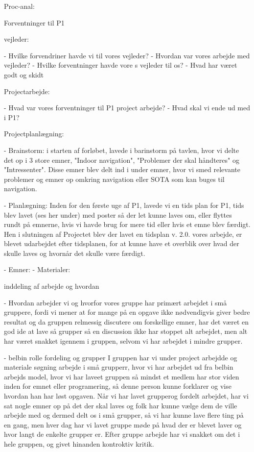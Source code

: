 Proc-anal:

Forventninger til P1

vejleder:

- Hvilke forvendriner havde vi til vores vejleder?
- Hvordan var vores arbejde med vejleder?
- Hvilke forventninger havde vore s vejleder til os?
- Hvad har været godt og skidt

Projectarbejde:

- Hvad var vores forventninger til P1 project arbejde? 
- Hvad skal vi ende ud med i P1?

Projectplanlægning:

- Brainstorm:
i starten af forløbet, lavede i barinstorm på tavlen, hvor vi delte det op i 3 store  emner, "Indoor navigation", "Problemer der skal håndteres" og "Intressenter". Disse emner blev delt ind i under emner, hvor vi smed relevante problemer og emner op omkring navigation eller SOTA som kan buges til navigation. 

- Planlægning:
Inden for den første uge af P1, lavede vi en tids plan for P1, tids blev lavet (ses her under) med poster så der let kunne laves om, eller flyttes rundt på emnerne, hvis vi havde brug for mere tid eller hvis et emne blev færdigt. Hen i slutningen af Projectet blev der lavet  en tidsplan v. 2.0. vores arbejde, er blevet udarbejdet  efter tidsplanen, for at kunne have et overblik over hvad der skulle laves og hvornår det skulle være færdigt.

- Emner:
- Materialer:

inddeling af arbejde og hvordan

- Hvordan arbejder  vi og hvorfor 
vores gruppe har primært arbejdet i små gruppere, fordi vi mener at for mange på en opgave ikke nødvendigvis giver bedre  resultat og da gruppen relmessig discutere om forskellige emner, har det været en god ide at lave så grupper så en discussion ikke har stoppet alt arbejdet, men alt har været snakket  igennem i gruppen, selvom vi har arbejdet i mindre grupper. 

- belbin rolle fordeling og grupper
I gruppen har vi under project arbejdde og materiale søgning arbejde i små grupperr, hvor vi har arbejdet ud fra belbin arbejds model, hvor vi har laveet  gruppen så mindst et medlem har stor viden inden for emnet eller programering, så denne person kunne forklarer og vise hvordan han har løst opgaven. 
Når vi har lavet grupperog fordelt arbejdet, har vi sat nogle emner op på det der skal laves og folk har kunne vælge dem de ville arbejde med og dermed delt os i små grupper, så vi har kunne lave flere ting på en gang, men hver dag har vi lavet gruppe møde på hvad der er blevet laver  og hvor langt de enkelte grupper er. Efter gruppe arbejde har vi snakket  om det i hele  gruppen, og givet  hinanden kontroktiv kritik.
 
